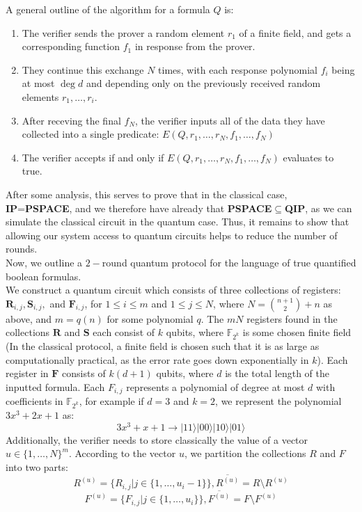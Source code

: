 \documentclass[12pt]{article}
\newcommand{\ket}[1]{\vert #1 \rangle}
\begin{document}
	\noindent A general outline of the algorithm for a formula $Q$ is:
	 \begin{enumerate}
	 	\item The verifier sends the prover a random element $r_1$ of a finite field, and gets a corresponding function $f_1$ in response from the prover.
	 	\item They continue this exchange $N$ times, with each response polynomial $f_i$ being at most $\deg d$ and  depending only on the previously received random elements $r_1,\dots,r_{i}$. 
	 	\item After receving  the final $f_N$, the verifier inputs all of the data they have collected into a single predicate: $E(Q,r_1,\dots,r_N,f_1,\dots,f_N)$
	 	\item The verifier accepts if and only if $E(Q,r_1,\dots,r_N,f_1,\dots,f_N)$ evaluates to true.
	 \end{enumerate}
	 	
	After some analysis, this serves to prove that in the classical case, \textbf{IP}=\textbf{PSPACE}, and we therefore have already that \textbf{PSPACE}$\subseteq$\textbf{QIP}, as we can simulate the classical circuit in the quantum case. Thus, it remains to show that allowing our system access to quantum circuits helps to reduce the number of rounds.\\
	
	Now, we outline a $2-$round quantum protocol for the language of true quantified boolean formulas. \\
	
	We construct a quantum circuit which consists of three collections of registers: $\textbf{R}_{i,j},\textbf{S}_{i,j},$ and $\textbf{F}_{i,j}$, for $1\leq i\leq m$ and $1\leq j\leq N$, where $N={{n+1}\choose{2}}+n$ as above, and $m=q(n)$ for some polynomial $q$. The $mN$ registers found in the collections $\textbf{R}$ and $\textbf{S}$ each consist of $k$ qubits, where $\mathbb{F}_{2^k}$ is some chosen finite field (In the classical protocol, a finite field is chosen such that it is as large as computationally practical, as the error rate goes down exponentially in $k$). Each register in $\textbf{F}$ consists of $k(d+1)$ qubits, where $d$ is the total length of the inputted formula. Each $F_{i,j}$ represents a polynomial of degree at most $d$ with coefficients in $\mathbb{F}_{2^k}$, for example if $d=3$ and $k=2$, we represent the polynomial $3x^3+2x+1$ as:
	\[3x^3+x+1\to \ket{11}\ket{00}\ket{10}\ket{01}\]
	Additionally, the verifier needs to store classically the value of a vector $u\in\{1,\dots,N\}^m$. According to the vector $u$, we partition the collections $R$ and $F$ into two parts:
	\[R^{(u)}=\{R_{i,j}|j\in\{1,\dots,u_i-1\}\}, \overline{R^{(u)}}=R \setminus R^{(u)}\]
	\[F^{(u)}=\{F_{i,j}|j\in\{1,\dots,u_i\}\}, \overline{F^{(u)}}=F \setminus F^{(u)}\]
	
\end{document}
